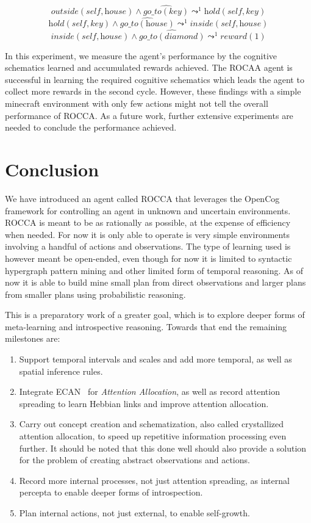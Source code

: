 \documentclass[runningheads]{llncs}
\newcommand{\lpreimp}[1]{\leadsto^{#1}}
\newcommand{\ldo}[1]{\widehat{#1}}
\begin{document}
$$\textit{outside}(\textit{self}, \textit{house}) \land \ldo{\textit{go\_to}(\textit{key})} \lpreimp{1} \textit{hold}(\textit{self}, \textit{key})$$
$$\textit{hold}(\textit{self}, \textit{key}) \land \ldo{\textit{go\_to}(\textit{house})} \lpreimp{1} \textit{inside}(\textit{self}, \textit{house})$$
$$\textit{inside}(\textit{self}, \textit{house}) \land \ldo{\textit{go\_to}(\textit{diamond})} \lpreimp{1} \textit{reward}(1)$$

In this experiment, we measure the agent's performance by the cognitive schematics learned and accumulated rewards achieved. The ROCAA agent is successful in learning the required cognitive schematics which leads the agent to collect more rewards in the second cycle. However, these findings with a simple minecraft environment with only few actions might not tell the overall performance of ROCCA. As a future work, further extensive experiments are needed to conclude the performance achieved.

\section{Conclusion}
\label{sec:conclusion}
We have introduced an agent called ROCCA that leverages the OpenCog
framework for controlling an agent in unknown and uncertain
environments.  ROCCA is meant to be as rationally as possible, at the
expense of efficiency when needed.  For now it is only able to operate
is very simple environments involving a handful of actions and
observations.  The type of learning used is however meant be
open-ended, even though for now it is limited to syntactic hypergraph
pattern mining and other limited form of temporal reasoning.  As of
now it is able to build mine small plan from direct observations and
larger plans from smaller plans using probabilistic reasoning.

This is a preparatory work of a greater goal, which is to explore
deeper forms of meta-learning and introspective reasoning.  Towards
that end the remaining milestones are:
\begin{enumerate}
\item Support temporal intervals and scales and add more temporal, as
  well as spatial inference rules.
\item Integrate ECAN~\cite{TODO} for \emph{Attention Allocation}, as
  well as record attention spreading to learn Hebbian links and
  improve attention allocation.
\item Carry out concept creation and schematization, also called
  crystallized attention allocation, to speed up repetitive
  information processing even further.  It should be noted that this
  done well should also provide a solution for the problem of creating
  abstract observations and actions.
\item Record more internal processes, not just attention spreading, as
  internal percepta to enable deeper forms of introspection.
\item Plan internal actions, not just external, to enable self-growth.
\end{enumerate}
\end{document}
